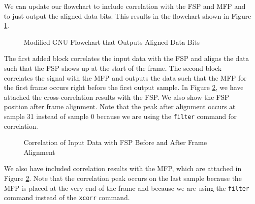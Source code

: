 \documentclass[conference,onecolumn]{IEEEtran}
\begin{document}
We can update our flowchart to include correlation with the FSP and MFP and to just output the aligned data bits. This results in the flowchart shown in Figure \ref{fig::frame_align}.

\begin{figure}[H]
	\centerline{}
	\caption{Modified GNU Flowchart that Outputs Aligned Data Bits}
	\label{fig::frame_align}
\end{figure}

The first added block correlates the input data with the FSP and aligns the data such that the FSP shows up at the start of the frame. The second block correlates the signal with the MFP and outputs the data such that the MFP for the first frame occurs right before the first output sample. In Figure \ref{fig::fsp_correlation_gnu_radio}, we have attached the cross-correlation results with the FSP. We also show the FSP position after frame alignment. Note that the peak after alignment occurs at sample 31 instead of sample 0 because we are using the \texttt{filter} command for correlation.

\begin{figure}[H]
	\centerline{}
	\caption{Correlation of Input Data with FSP Before and After Frame Alignment}
	\label{fig::fsp_correlation_gnu_radio}
\end{figure}

We also have included correlation results with the MFP, which are attached in Figure \ref{fig::fsp_correlation_gnu_radio}. Note that the correlation peak occurs on the last sample because the MFP is placed at the very end of the frame and because we are using the \texttt{filter} command instead of the \texttt{xcorr} command.
\end{document}
